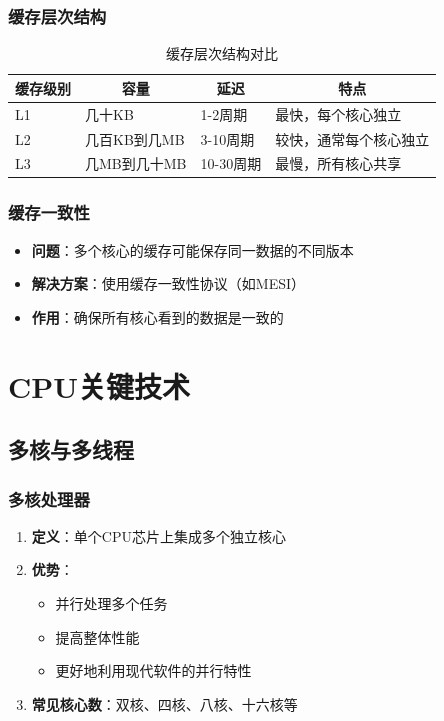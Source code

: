 \documentclass[12pt,UTF8]{ctexbook}
\begin{document}
\section{缓存层次结构}

\begin{table}[H]
    \centering
    \begin{tabularx}{\textwidth}{|p{3cm}|p{3cm}|p{3cm}|p{5cm}|}
        \hline
        \multicolumn{1}{|c|}{\textbf{缓存级别}} & \multicolumn{1}{c|}{\textbf{容量}} & \multicolumn{1}{c|}{\textbf{延迟}} & \multicolumn{1}{c|}{\textbf{特点}} \\
        \hline
        L1 & 几十KB & 1-2周期 & 最快，每个核心独立 \\
        \hline
        L2 & 几百KB到几MB & 3-10周期 & 较快，通常每个核心独立 \\
        \hline
        L3 & 几MB到几十MB & 10-30周期 & 最慢，所有核心共享 \\
        \hline
    \end{tabularx}
    \caption{缓存层次结构对比}
    \label{tab:cache_hierarchy}
\end{table}

\section{缓存一致性}

\begin{itemize}[leftmargin=2em]
    \item \textbf{问题}：多个核心的缓存可能保存同一数据的不同版本
    \item \textbf{解决方案}：使用缓存一致性协议（如MESI）
    \item \textbf{作用}：确保所有核心看到的数据是一致的
\end{itemize}

\part{CPU关键技术}

\chapter{多核与多线程}

\section{多核处理器}

\begin{enumerate}
    \item \textbf{定义}：单个CPU芯片上集成多个独立核心
    \item \textbf{优势}：
    \begin{itemize}[leftmargin=2em]
        \item 并行处理多个任务
        \item 提高整体性能
        \item 更好地利用现代软件的并行特性
    \end{itemize}
    \item \textbf{常见核心数}：双核、四核、八核、十六核等
\end{enumerate}
\end{document}
